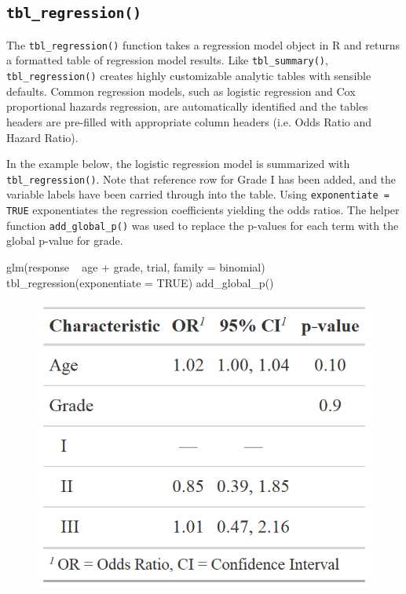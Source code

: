 \subsection{\texorpdfstring{\texttt{tbl\_regression()}}{tbl\_regression()}}

The \texttt{tbl\_regression()} function takes a regression model object in R and returns a formatted table of regression model results. 
Like \texttt{tbl\_summary()}, \texttt{tbl\_regression()} creates highly customizable analytic tables with sensible defaults.
Common regression models, such as logistic regression and Cox proportional hazards regression, are automatically identified and the tables headers are pre-filled with appropriate column headers (i.e. Odds Ratio and Hazard Ratio).

In the example below, the logistic regression model is summarized with \texttt{tbl\_regression()}.
Note that reference row for Grade I has been added, and the variable labels have been carried through into the table.
Using \texttt{exponentiate = TRUE} exponentiates the regression coefficients yielding the odds ratios.
The helper function \texttt{add\_global\_p()} was used to replace the p-values for each term with the global p-value for grade.

\begin{example}
glm(response ~ age + grade, trial, family = binomial) %
  tbl_regression(exponentiate = TRUE) %
  add_global_p()
\end{example}

\begin{figure}[h!]
  \includegraphics[scale=0.28]{regression.png}
  \centering
\end{figure}

